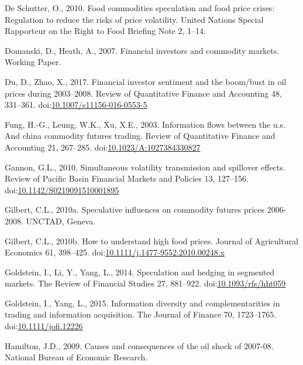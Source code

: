 \documentclass[]{elsarticle} %
\begin{document}
\leavevmode\hypertarget{ref-deschutter_food_2010}{}%
De Schutter, O., 2010. Food commodities speculation and food price
crises: Regulation to reduce the risks of price volatility. United
Nations Special Rapporteur on the Right to Food Briefing Note 2, 1--14.

\leavevmode\hypertarget{ref-domanski_financial_2007}{}%
Domanski, D., Heath, A., 2007. Financial investors and commodity
markets. Working Paper.

\leavevmode\hypertarget{ref-du_financial_2017}{}%
Du, D., Zhao, X., 2017. Financial investor sentiment and the boom/bust
in oil prices during 2003--2008. Review of Quantitative Finance and
Accounting 48, 331--361.
doi:\href{https://doi.org/10.1007/s11156-016-0553-5}{10.1007/s11156-016-0553-5}

\leavevmode\hypertarget{ref-fung_information_2003}{}%
Fung, H.-G., Leung, W.K., Xu, X.E., 2003. Information flows between the
u.s. And china commodity futures trading. Review of Quantitative Finance
and Accounting 21, 267--285.
doi:\href{https://doi.org/10.1023/A:1027384330827}{10.1023/A:1027384330827}

\leavevmode\hypertarget{ref-gannon_simultaneous_2010}{}%
Gannon, G.L., 2010. Simultaneous volatility transmission and spillover
effects. Review of Pacific Basin Financial Markets and Policies 13,
127--156.
doi:\href{https://doi.org/10.1142/S0219091510001895}{10.1142/S0219091510001895}

\leavevmode\hypertarget{ref-gilbert_speculative_2010}{}%
Gilbert, C.L., 2010a. Speculative influences on commodity futures prices
2006-2008. UNCTAD, Geneva.

\leavevmode\hypertarget{ref-gilbert_how_2010}{}%
Gilbert, C.L., 2010b. How to understand high food prices. Journal of
Agricultural Economics 61, 398--425.
doi:\href{https://doi.org/10.1111/j.1477-9552.2010.00248.x}{10.1111/j.1477-9552.2010.00248.x}

\leavevmode\hypertarget{ref-goldstein_speculation_2014}{}%
Goldstein, I., Li, Y., Yang, L., 2014. Speculation and hedging in
segmented markets. The Review of Financial Studies 27, 881--922.
doi:\href{https://doi.org/10.1093/rfs/hht059}{10.1093/rfs/hht059}

\leavevmode\hypertarget{ref-goldstein_information_2015}{}%
Goldstein, I., Yang, L., 2015. Information diversity and
complementarities in trading and information acquisition. The Journal of
Finance 70, 1723--1765.
doi:\href{https://doi.org/10.1111/jofi.12226}{10.1111/jofi.12226}

\leavevmode\hypertarget{ref-hamilton_causes_2009}{}%
Hamilton, J.D., 2009. Causes and consequences of the oil shock of
2007-08. National Bureau of Economic Research.
\end{document}
